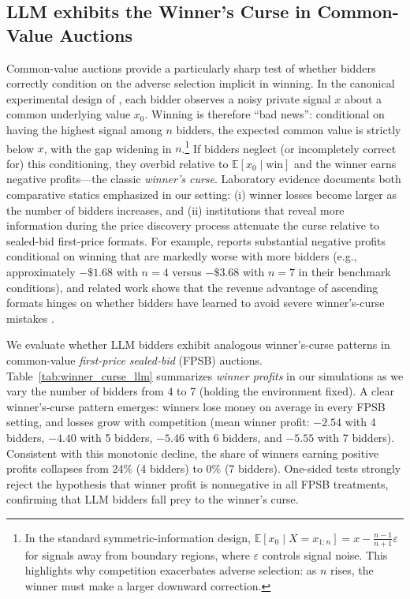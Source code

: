 \subsection{LLM exhibits the Winner's Curse in Common-Value Auctions}
\label{sec:winners_curse}

Common-value auctions provide a particularly sharp test of whether bidders correctly condition on the adverse selection implicit in winning. In the canonical experimental design of \citet{kagel1986winner}, each bidder observes a noisy private signal $x$ about a common underlying value $x_0$. Winning is therefore ``bad news'': conditional on having the highest signal among $n$ bidders, the expected common value is strictly below $x$, with the gap widening in $n$.\footnote{In the standard symmetric-information design, $\mathbb{E}[x_0 \mid X=x_{1:n}] = x - \frac{n-1}{n+1}\varepsilon$ for signals away from boundary regions, where $\varepsilon$ controls signal noise. This highlights why competition exacerbates adverse selection: as $n$ rises, the winner must make a larger downward correction.} If bidders neglect (or incompletely correct for) this conditioning, they overbid relative to $\mathbb{E}[x_0\mid \text{win}]$ and the winner earns negative profits---the classic \emph{winner's curse}. Laboratory evidence documents both comparative statics emphasized in our setting: (i) winner losses become larger as the number of bidders increases, and (ii) institutions that reveal more information during the price discovery process attenuate the curse relative to sealed-bid first-price formats. For example, \citet{kagel1986winner} reports substantial negative profits conditional on winning that are markedly worse with more bidders (e.g., approximately $-\$1.68$ with $n=4$ versus $-\$3.68$ with $n=7$ in their benchmark conditions), and related work shows that the revenue advantage of ascending formats hinges on whether bidders have learned to avoid severe winner's-curse mistakes \citep{levin1996revenue}.


We evaluate whether LLM bidders exhibit analogous winner's-curse patterns in common-value \emph{first-price sealed-bid} (FPSB) auctions. Table~\ref{tab:winner_curse_llm} summarizes \emph{winner profits} in our simulations as we vary the number of bidders from 4 to 7 (holding the environment fixed). A clear winner’s-curse pattern emerges: winners lose money on average in every FPSB setting, and losses grow with competition (mean winner profit: $-2.54$ with 4 bidders, $-4.40$ with 5 bidders, $-5.46$ with 6 bidders, and $-5.55$ with 7 bidders). Consistent with this monotonic decline, the share of winners earning positive profits collapses from 24\% (4 bidders) to 0\% (7 bidders). One-sided tests strongly reject the hypothesis that winner profit is nonnegative in all FPSB treatments, confirming that LLM bidders fall prey to the winner’s curse\citep{kagel1986winner}.

